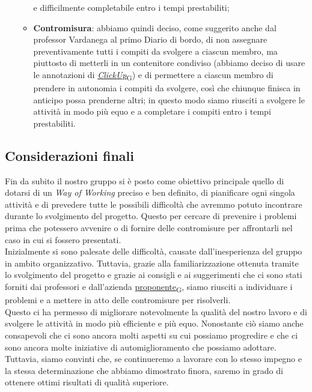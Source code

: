 \begin{itemize}
\begin{itemize}
        e difficilmente completabile entro i tempi prestabiliti;
        \item \textbf{Contromisura}: abbiamo quindi deciso, come suggerito anche dal professor Vardanega al primo Diario di bordo, 
        di non assegnare preventivamente tutti i compiti da svolgere a ciascun membro, ma piuttosto di metterli in un contenitore 
        condiviso (abbiamo deciso di usare le annotazioni di \href{https://7last.github.io/docs/rtb/documentazione-interna/glossario\#clickup}{\textit{ClickUp}\textsubscript{G}}) e di permettere a ciascun membro di prendere in 
        autonomia i compiti da svolgere, così che chiunque finisca in anticipo possa prenderne altri; in questo modo siamo riusciti 
        a svolgere le attività in modo più equo e a completare i compiti entro i tempi prestabiliti.
    \end{itemize}
\end{itemize}

\subsection{Considerazioni finali}
Fin da subito il nostro gruppo si è posto come obiettivo principale quello di dotarsi di un \textit{Way of Working} preciso 
e ben definito, di pianificare ogni singola attività e di prevedere tutte le possibili difficoltà che avremmo potuto incontrare
durante lo svolgimento del progetto. Questo per cercare di prevenire i problemi prima che potessero avvenire o di fornire delle 
contromisure per affrontarli nel caso in cui si fossero presentati. \\
Inizialmente si sono palesate delle difficoltà, causate dall'inesperienza del gruppo in ambito organizzativo. Tuttavia, grazie alla 
familiarizzazione ottenuta tramite lo svolgimento del progetto e grazie ai consigli e ai suggerimenti che ci 
sono stati forniti dai professori e dall'azienda \href{https://7last.github.io/docs/rtb/documentazione-interna/glossario\#proponente}{proponente\textsubscript{G}}, 
siamo riusciti a individuare i problemi e a mettere in atto delle contromisure per risolverli. \\
Questo ci ha permesso di migliorare notevolmente la qualità del nostro lavoro e di svolgere le attività in modo più efficiente e più equo. 
Nonostante ciò siamo anche consapevoli che ci sono ancora molti aspetti su cui possiamo progredire e che ci sono ancora molte 
iniziative di automiglioramento che possiamo adottare. Tuttavia, siamo convinti che, se continueremo a lavorare con lo stesso impegno e 
la stessa determinazione che abbiamo dimostrato finora, saremo in grado di ottenere ottimi risultati di qualità superiore.